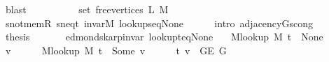 \begin{isabellebody}
\ blast\isanewline
\ \ \isamarkupfalse%
\isanewline
\ \ \isamarkupfalse%
\ \isamarkupfalse%
\ {\isachardoublequoteopen}{\isachardot}{\kern0pt}{\isachardot}{\kern0pt}{\isachardot}{\kern0pt}\ {\isacharequal}{\kern0pt}\ set\ {\isacharparenleft}{\kern0pt}free{\isacharunderscore}{\kern0pt}vertices\ L\ M{\isacharparenright}{\kern0pt}{\isachardoublequoteclose}\isanewline
\ \ \ \ \isamarkupfalse%
\ s{\isacharunderscore}{\kern0pt}not{\isacharunderscore}{\kern0pt}mem{\isacharunderscore}{\kern0pt}R\ s{\isacharunderscore}{\kern0pt}neq{\isacharunderscore}{\kern0pt}t\ invar{\isacharunderscore}{\kern0pt}M\ lookup{\isacharunderscore}{\kern0pt}s{\isacharunderscore}{\kern0pt}eq{\isacharunderscore}{\kern0pt}None\isanewline
\ \ \ \ \isamarkupfalse%
\ {\isacharparenleft}{\kern0pt}intro\ adjacency{\isacharunderscore}{\kern0pt}G{}{\isacharunderscore}{\kern0pt}s{\isacharunderscore}{\kern0pt}cong{\isacharparenright}{\kern0pt}\isanewline
\ \ \isamarkupfalse%
\ \isamarkupfalse%
\ {\isacharquery}{\kern0pt}thesis\isanewline
\ \ \ \ \isacommand{{\isachardot}{\kern0pt}}\isamarkupfalse%
\isanewline
{}\isamarkupfalse%
%
\endisatagproof
{\isafoldproof}%
%
\isadelimproof
\isanewline
%
\endisadelimproof
%
\isadeliminvisible
\isanewline
%
\endisadeliminvisible
%
\isataginvisible
{}\isamarkupfalse%
\ {\isacharparenleft}{\kern0pt}\ edmonds{\isacharunderscore}{\kern0pt}karp{\isacharunderscore}{\kern0pt}invar{\isacharparenright}{\kern0pt}\ lookup{\isacharunderscore}{\kern0pt}t{\isacharunderscore}{\kern0pt}eq{\isacharunderscore}{\kern0pt}None{\isacharcolon}{\kern0pt}\isanewline
\ \ \ {\isachardoublequoteopen}M{\isacharunderscore}{\kern0pt}lookup\ M\ t\ {\isacharequal}{\kern0pt}\ None{\isachardoublequoteclose}%
\endisataginvisible
{\isafoldinvisible}%
%
\isadeliminvisible
\isanewline
%
\endisadeliminvisible
%
\isadelimproof
%
\endisadelimproof
%
\isatagproof
{}\isamarkupfalse%
\ {\isacharminus}{\kern0pt}\isanewline
\ \ \isacommand{{\isacharbraceleft}{\kern0pt}}\isamarkupfalse%
\ \isamarkupfalse%
\ v\isanewline
\ \ \ \ \isamarkupfalse%
\ {\isachardoublequoteopen}M{\isacharunderscore}{\kern0pt}lookup\ M\ t\ {\isacharequal}{\kern0pt}\ Some\ v{\isachardoublequoteclose}\isanewline
\ \ \ \ \isamarkupfalse%
\ {\isachardoublequoteopen}{\isacharbraceleft}{\kern0pt}t{\isacharcomma}{\kern0pt}\ v{\isacharbraceright}{\kern0pt}\ {\isasymin}\ G{\isachardot}{\kern0pt}E\ G{\isachardoublequoteclose}\isanewline

\end{isabellebody}
